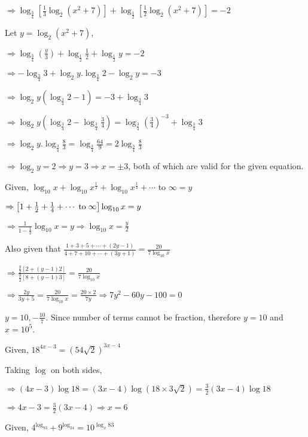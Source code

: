   $\Rightarrow \log_{\tfrac{3}{4}}\left[\frac{1}{3}\log_2(x^2 + 7)\right] + \log_{\tfrac{1}{2}}\left[\frac{1}{2}\log_2(x^2 + 7)\right] = -2$

  Let $y = \log_2(x^2 + 7)$,

  $\Rightarrow \log_{\tfrac{3}{4}}\left(\frac{y}{3}\right) + \log_{\tfrac{1}{2}}\tfrac{1}{2} + \log_{\tfrac{1}{2}}y = -2$

  $\Rightarrow -\log_{\tfrac{3}{4}}3 + \log_2y.\log_{\tfrac{3}{4}}2 - \log_2y = -3$

  $\Rightarrow \log_2y\left(\log_{\tfrac{3}{4}}2 - 1\right) = -3 + \log_{\tfrac{3}{4}}3$

  $\Rightarrow \log_2y\left(\log_{\tfrac{3}{4}}2 - \log_{\tfrac{3}{4}}\tfrac{3}{4}\right) = \log_{\tfrac{3}{4}}\left(\tfrac{3}{4}\right)^{-3} + \log_{\tfrac{3}{4}}3$

  $\Rightarrow \log_2y.\log_{\tfrac{3}{4}}\tfrac{8}{3} = \log_{\tfrac{3}{4}}\tfrac{64}{9} = 2\log_{\tfrac{3}{4}}\tfrac{8}{3}$

  $\Rightarrow \log_2y = 2 \Rightarrow y = 3 \Rightarrow x = \pm3$, both of which are valid for the given equation.
\item Given, $\log_{10}x + \log_{10}x^{\tfrac{1}{2}} + \log_{10}x^{\tfrac{1}{4}} + \cdots$ to $\infty = y$

  $\Rightarrow \left[1 + \frac{1}{2} + \frac{1}{4} + \cdots\;{\rm to}\;\infty\right]\log_{10}x = y$

  $\Rightarrow \frac{1}{1 - \frac{1}{2}}\log_{10}x = y \Rightarrow \log_{10}x = \frac{y}{2}$

  Also given that $\frac{1 + 3 + 5 + \cdots + (2y - 1)}{4 + 7 + 10 + \cdots + (3y + 1)} = \frac{20}{7\log_{10}x}$

  $\Rightarrow \frac{\frac{y}{2}[2 + (y - 1)2]}{\frac{y}{2}[8 + (y - 1)3]} = \frac{20}{7\log_{10}x}$

  $\Rightarrow \frac{2y}{3y + 5} = \frac{20}{7\log_{10}x} = \frac{20\times2}{7y} \Rightarrow 7y^2 - 60y - 100 = 0$

  $y = 10, -\frac{10}{7}$. Since number of terms cannot be fraction, therefore $y = 10$ and $x = 10^5$.
\item Given, $18^{4x - 3} = (54\sqrt{2})^{3x - 4}$

  Taking $\log$ on both sides,

  $\Rightarrow (4x - 3)\log18 = (3x - 4)\log(18\times3\sqrt{2}) = \frac{3}{2}(3x -4)\log18$

  $\Rightarrow 4x - 3 = \frac{3}{2}(3x - 4) \Rightarrow x = 6$
\item Given, $4^{\log_93} + 9^{\log_24} = 10^{\log_x83}$

